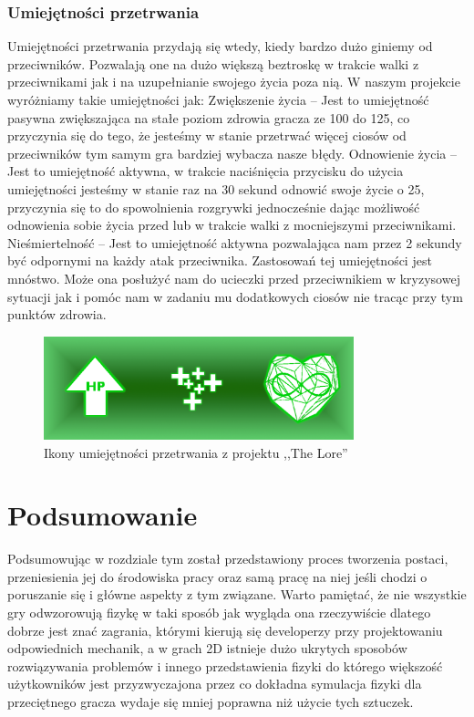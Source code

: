 \documentclass[oneside,polski,logo]{amuthesis}
\begin{document}
\subsubsection{Umiejętności przetrwania}
Umiejętności przetrwania przydają się wtedy, kiedy bardzo dużo giniemy od przeciwników. Pozwalają one na dużo większą beztroskę w trakcie walki z przeciwnikami jak i na uzupełnianie swojego życia poza nią. W naszym projekcie wyróżniamy takie umiejętności jak:
Zwiększenie życia – Jest to umiejętność pasywna zwiększająca na stałe poziom zdrowia gracza ze 100 do 125, co przyczynia się do tego, że jesteśmy w stanie przetrwać więcej ciosów od przeciwników tym samym gra bardziej wybacza nasze błędy.
Odnowienie życia – Jest to umiejętność aktywna, w trakcie naciśnięcia przycisku do użycia umiejętności jesteśmy w stanie raz na 30 sekund odnowić swoje życie o 25, przyczynia się to do spowolnienia rozgrywki jednocześnie dając możliwość odnowienia sobie życia przed lub w trakcie walki z mocniejszymi przeciwnikami.
Nieśmiertelność – Jest to umiejętność aktywna pozwalająca nam przez 2 sekundy być odpornymi na każdy atak przeciwnika. Zastosowań tej umiejętności jest mnóstwo. Może ona posłużyć nam do ucieczki przed przeciwnikiem w kryzysowej sytuacji jak i pomóc nam w zadaniu mu dodatkowych ciosów nie tracąc przy tym punktów zdrowia. 

\begin{figure}[h]
	\centering
	\includegraphics[width=9cm]{images/kozubal/patience.png}
	\caption{Ikony umiejętności przetrwania z projektu ,,The Lore''}
\end{figure}

\section{Podsumowanie}
Podsumowując w rozdziale tym został przedstawiony proces tworzenia postaci, przeniesienia jej do środowiska pracy oraz samą pracę na niej jeśli chodzi o poruszanie się i główne aspekty z tym związane. Warto pamiętać, że nie wszystkie gry odwzorowują fizykę w taki sposób jak wygląda ona rzeczywiście dlatego dobrze jest znać zagrania, którymi kierują się developerzy przy projektowaniu odpowiednich mechanik, a w grach 2D istnieje dużo ukrytych sposobów rozwiązywania problemów i innego przedstawienia fizyki do którego większość użytkowników jest przyzwyczajona przez co dokładna symulacja fizyki dla przeciętnego gracza wydaje się mniej poprawna niż użycie tych sztuczek.
\end{document}
